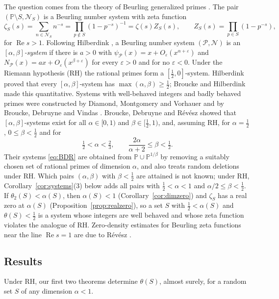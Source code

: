 \documentclass[11pt]{amsart}
\theoremstyle{remark}
\numberwithin{equation}{section}
\newcommand{\PP}{\mathbb{P}}
\newcommand{\cN}{\mathcal{N}}
\newcommand{\eps}{\varepsilon}
\DeclareMathOperator{\re}{Re}
\begin{document}
The question comes from the theory of Beurling generalized primes \cite{Beurling,DZ}. The pair $(\PP\setminus S,\cN_S)$ is a Beurling number system with zeta function
\begin{equation}\label{eq:zetaS}
\zeta_S(s)=\sum_{n\in\cN_S}n^{-s}=\prod_{p\notin S}(1-p^{-s})^{-1}=\zeta(s)Z_S(s),\qquad Z_S(s)=\prod_{p\in S}(1-p^{-s}),
\end{equation}
for $\re s>1$. Following Hilberdink \cite{H05}, a Beurling number system $(\mathcal P,\mathcal N)$ is an \emph{$[\alpha,\beta]$-system} if there is $a>0$ with $\psi_{\mathcal P}(x)=x+O_\eps(x^{\alpha+\eps})$ and $N_{\mathcal P}(x)=ax+O_\eps(x^{\beta+\eps})$ for every $\eps>0$ and for no $\eps<0$. Under the Riemann hypothesis (RH) the rational primes form a $[\tfrac12,0]$-system. Hilberdink \cite{H05} proved that every $[\alpha,\beta]$-system has $\max(\alpha,\beta)\ge\tfrac12$; Broucke and Hilberdink \cite{BH} made this quantitative. Systems with well-behaved integers and badly behaved primes were constructed by Diamond, Montgomery and Vorhauer \cite{DMV} and by Broucke, Debruyne and Vindas \cite{BDV}. Broucke, Debruyne and R\'ev\'esz \cite{BDR} showed that $[\alpha,\beta]$-systems exist for all $\alpha\in[0,1)$ and $\beta\in[\tfrac12,1)$, and, assuming RH, for $\alpha=\tfrac12$, $0\le\beta<\tfrac12$ and for
\begin{equation}\label{eq:BDR}
\tfrac12<\alpha<\tfrac23,\qquad \frac{2\alpha}{\alpha+2}\le\beta<\tfrac12 .
\end{equation}
Their systems \eqref{eq:BDR} are obtained from $\PP\cup\PP^{1/\beta}$ by removing a suitably chosen set of rational primes of dimension $\alpha$, and \cite[\S5]{BDR} also treats random deletions under RH. Which pairs $(\alpha,\beta)$ with $\beta<\tfrac12$ are attained is not known; under RH, Corollary~\ref{cor:systems}(3) below adds all pairs with $\tfrac12<\alpha<1$ and $\alpha/2\le\beta<\tfrac12$. If $\theta_2(S)<\alpha(S)$, then $\alpha(S)<1$ (Corollary~\ref{cor:dimzero}) and $\zeta_S$ has a real zero at $\alpha(S)$ (Proposition~\ref{prop:realzero}), so a set $S$ with $\tfrac12<\alpha(S)$ and $\theta(S)<\tfrac12$ is a system whose integers are well behaved and whose zeta function violates the analogue of RH. Zero-density estimates for Beurling zeta functions near the line $\re s=1$ are due to R\'ev\'esz \cite{Revesz}.

\subsection{Results}
Under RH, our first two theorems determine $\theta(S)$, almost surely, for a random set $S$ of any dimension $\alpha<1$.
\end{document}
